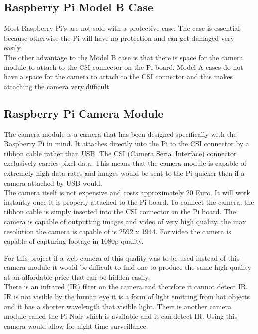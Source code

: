 \documentclass[12pt]{report}
\begin{document}
\subsection{Raspberry Pi Model B Case}
\label{subsec:raspberrypicase}
Most Raspberry Pi's are not sold with a protective case. The case is essential because otherwise the Pi will have no protection and can get damaged very easily. \\ 

The other advantage to the Model B case is that there is space for the camera module to attach to the CSI connector on the Pi board. Model A cases do not have a space for the camera to attach to the CSI connector and this makes attaching the camera very difficult.\\


\clearpage %
\noindent
\subsection{Raspberry Pi Camera Module}
\label{subsec:raspberrypicammod}
The camera module is a camera that has been designed specifically with the Raspberry Pi in mind. It attaches directly into the Pi to the CSI connector by a ribbon cable rather than USB. The CSI (Camera Serial Interface) connector exclusively carries pixel data. This means that the camera module is capable of extremely high data rates and images would be sent to the Pi quicker then if a camera attached by USB would.\\

The camera itself is not expensive and costs approximately 20 Euro. It will work instantly once it is properly attached to the Pi board. To connect the camera, the ribbon cable is simply inserted into the CSI connector on the Pi board. The camera is capable of outputting images and video of very high quality, the max resolution the camera is capable of is 2592 x 1944. For video the camera is capable of capturing footage in 1080p quality. 

For this project if a web camera of this quality was to be used instead of this camera module it would be difficult to find one to produce the same high quality at an affordable price that can be hidden easily.\\

There is an infrared (IR) filter on the camera and therefore it cannot detect IR. IR is not visible by the human eye it is a form of light emitting from hot objects and it has a shorter wavelength that visible light. There is another camera module called the Pi Noir which is available and it can detect IR. Using this camera would allow for night time surveillance.\\ 
\end{document}
